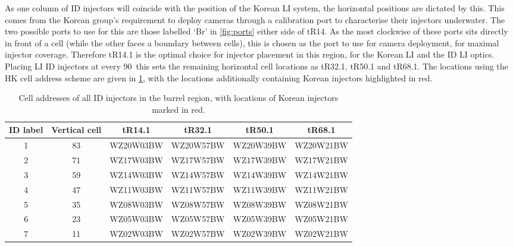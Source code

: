 \documentclass[a4paper,11pt]{article}
\begin{document}
As one column of ID injectors will coincide with the position of the Korean LI system, the horizontal positions are dictated by this. This comes from the Korean group's requirement to deploy cameras through a calibration port to characterise their injectors underwater. The two possible ports to use for this are those labelled `Br' in \cref{fig:ports} either side of tR14. As the most clockwise of these ports sits directly in front of a cell (while the other faces a boundary between cells), this is chosen as the port to use for camera deployment, for maximal injector coverage. Therefore tR14.1 is the optimal choice for injector placement in this region, for the Korean LI and the ID LI optics. Placing LI ID injectors at every 90\degree\ this sets the remaining horizontal cell locations as tR32.1, tR50.1 and tR68.1. The locations using the HK cell address scheme are given in \cref{tab:barrelIDAddresses}, with the locations additionally containing Korean injectors highlighted in red.

\begin{table}[h!]
    \centering
    \begin{tabular}{cc|cccc} \toprule
    ID label    &   Vertical cell  &   tR14.1  &   tR32.1  &   tR50.1  &   tR68.1  \\ \midrule
    1           &       83         &   WZ20W03BW    &   WZ20W57BW   &  WZ20W39BW   &   WZ20W21BW   \\
    2           &       71         &   {\color{red}WZ17W03BW}    &   WZ17W57BW   &  WZ17W39BW   &   WZ17W21BW \\ 
    3           &       59         &   {\color{red}WZ14W03BW}    &   WZ14W57BW   &  WZ14W39BW   &   WZ14W21BW \\ 
    4           &       47         &   {\color{red}WZ11W03BW}    &   WZ11W57BW   &  WZ11W39BW   &   WZ11W21BW \\ 
    5           &       35         &   {\color{red}WZ08W03BW}    &   WZ08W57BW   &  WZ08W39BW   &   WZ08W21BW \\ 
    6           &       23         &   {\color{red}WZ05W03BW}    &   WZ05W57BW   &  WZ05W39BW   &   WZ05W21BW \\ 
    7           &       11         &   WZ02W03BW   &   WZ02W57BW   &   WZ02W39BW   &   WZ02W21BW \\ 
    \end{tabular}
    \caption{Cell addresses of all ID injectors in the barrel region, with locations of Korean injectors marked in red.}
    \label{tab:barrelIDAddresses}
\end{table}
\end{document}
